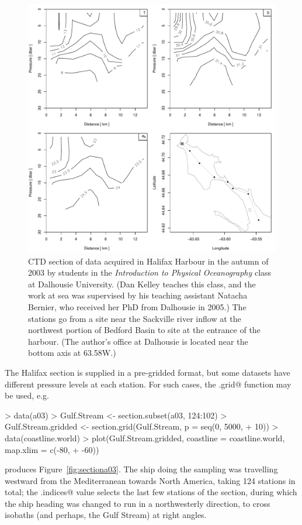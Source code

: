 \documentclass{article}
\begin{document}
\begin{figure}
\begin{center}
\includegraphics{oce-sectionfig}
\end{center}
\caption{\label{fig:section}
CTD section of data acquired in Halifax Harbour in the autumn of 2003 by
students in the \emph{Introduction to Physical Oceanography} class at Dalhousie
University.  (Dan Kelley teaches this class, and the work at sea was supervised
by his teaching assistant Natacha Bernier, who received her PhD from Dalhousie
in 2005.)  The stations go from a site near the Sackville river inflow at the
northwest portion of Bedford Basin to site at the entrance of the harbour. (The
author's office at Dalhousie is located near the bottom axis at 63.58W.)}
\end{figure}



The Halifax section is supplied in a pre-gridded format, but some datasets have
different pressure levels at each station.  For such cases, the
\verb@section.grid@ function may be used, e.g.
\begin{Schunk}
\begin{Sinput}
> data(a03)
> Gulf.Stream <- section.subset(a03, 124:102)
> Gulf.Stream.gridded <- section.grid(Gulf.Stream, p = seq(0, 5000, 
+     10))
> data(coastline.world)
> plot(Gulf.Stream.gridded, coastline = coastline.world, map.xlim = c(-80, 
+     -60))
\end{Sinput}
\end{Schunk}
produces Figure~\ref{fig:sectiona03}.  The ship doing the sampling was
travelling westward from the Mediterranean towards North America, taking 124
stations in total; the \verb@station.indices@ value selects the last few
stations of the section, during which the ship heading was changed to run in a
northwesterly direction, to cross isobaths (and perhaps, the Gulf Stream) at
right angles.
\end{document}

